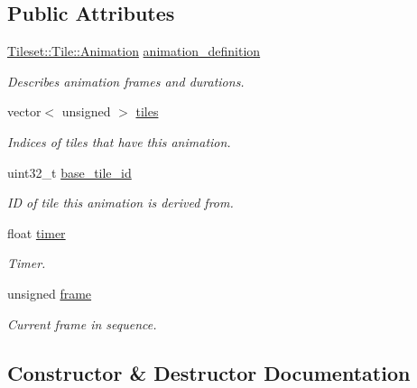 \subsection*{Public Attributes}
\begin{DoxyCompactItemize}
\item 
\hyperlink{structpixel_1_1_tileset_1_1_tile_1_1_animation}{Tileset\+::\+Tile\+::\+Animation} \hyperlink{classpixel_1_1_tile_layer_1_1_tile_animation_a768c92f745be44a78a96635f5088c662}{animation\+\_\+definition}
\begin{DoxyCompactList}\small\item\em Describes animation frames and durations. \end{DoxyCompactList}\item 
vector$<$ unsigned $>$ \hyperlink{classpixel_1_1_tile_layer_1_1_tile_animation_aa149a12e4eae31c60714565b2d64861e}{tiles}
\begin{DoxyCompactList}\small\item\em Indices of tiles that have this animation. \end{DoxyCompactList}\item 
uint32\+\_\+t \hyperlink{classpixel_1_1_tile_layer_1_1_tile_animation_a4d3f0a377f653a3103bb690972ae2a90}{base\+\_\+tile\+\_\+id}
\begin{DoxyCompactList}\small\item\em ID of tile this animation is derived from. \end{DoxyCompactList}\item 
float \hyperlink{classpixel_1_1_tile_layer_1_1_tile_animation_ab90e96c9b709cc00481bf292df529635}{timer}
\begin{DoxyCompactList}\small\item\em Timer. \end{DoxyCompactList}\item 
unsigned \hyperlink{classpixel_1_1_tile_layer_1_1_tile_animation_af61c1d3d11ec9adef814af303f78f769}{frame}
\begin{DoxyCompactList}\small\item\em Current frame in sequence. \end{DoxyCompactList}\end{DoxyCompactItemize}


\subsection{Constructor \& Destructor Documentation}
\mbox{\label{classpixel_1_1_tile_layer_1_1_tile_animation_a3a55d9218302b7aa924052612db0f048}} 

